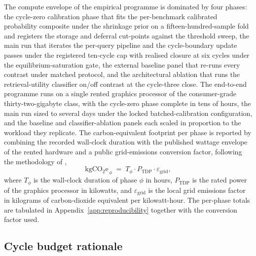The compute envelope of the empirical programme is dominated by four phases: the cycle-zero calibration phase that fits the per-benchmark calibrated probability composite under the shrinkage prior on a fifteen-hundred-sample fold and registers the storage and deferral cut-points against the threshold sweep, the main run that iterates the per-query pipeline and the cycle-boundary update passes under the registered ten-cycle cap with realised closure at six cycles under the equilibrium-saturation gate, the external baseline panel that re-runs every contrast under matched protocol, and the architectural ablation that runs the retrieval-utility classifier on/off contrast at the cycle-three close. The end-to-end programme runs on a single rented graphics processor of the consumer-grade thirty-two-gigabyte class, with the cycle-zero phase complete in tens of hours, the main run sized to several days under the locked batched-calibration configuration, and the baseline and classifier-ablation panels each scaled in proportion to the workload they replicate. The carbon-equivalent footprint per phase is reported by combining the recorded wall-clock duration with the published wattage envelope of the rented hardware and a public grid-emissions conversion factor, following the methodology of \textcite{strubell2019energy},
\begin{equation}
\mathrm{kgCO_{2}e}_{\,\phi} \;=\; T_{\phi} \cdot P_{\mathrm{TDP}} \cdot \varepsilon_{\mathrm{grid}},
\label{eq:carbon-per-phase}
\end{equation}
where $T_{\phi}$ is the wall-clock duration of phase $\phi$ in hours, $P_{\mathrm{TDP}}$ is the rated power of the graphics processor in kilowatts, and $\varepsilon_{\mathrm{grid}}$ is the local grid emissions factor in kilograms of carbon-dioxide equivalent per kilowatt-hour. The per-phase totals are tabulated in Appendix~\ref{app:reproducibility} together with the conversion factor used.

\subsection{Cycle budget rationale}
\label{sec:env-cycles}

